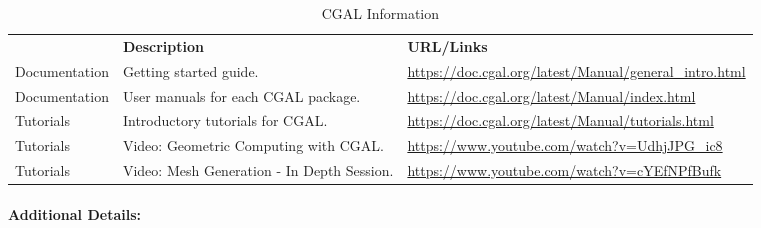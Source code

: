 \begin{table}[H]
{{    {
    \setlength{\parindent}{0pt}
    \def\arraystretch{1.25}
    {\fontsize{9}{11}\selectfont
    \begin{tabular}{!{\color{numpexgray}\vrule}p{0.20\textwidth}
                    !{\color{numpexgray}\vrule}p{0.40\textwidth}
                    !{\color{numpexgray}\vrule}p{0.35\textwidth}
                    !{\color{numpexgray}\vrule}}
         & {\rule{0pt}{2.5ex}\color{white}\bf Description}
         & {\rule{0pt}{2.5ex}\color{white}\bf URL/Links} \\
Documentation & Getting started guide. &  \url{https://doc.cgal.org/latest/Manual/general_intro.html}  \\
Documentation & User manuals for each CGAL package. &  \url{https://doc.cgal.org/latest/Manual/index.html}  \\
Tutorials & Introductory tutorials for CGAL. & \url{https://doc.cgal.org/latest/Manual/tutorials.html}  \\
Tutorials & Video: Geometric Computing with CGAL. & \url{https://www.youtube.com/watch?v=UdhjJPG_ic8}  \\
Tutorials & Video: Mesh Generation - In Depth Session. & \url{https://www.youtube.com/watch?v=cYEfNPfBufk}  \\
\bottomrule
    \end{tabular}
    }}
    }}
    \caption{CGAL Information}
\end{table}

\paragraph{Additional Details:}


